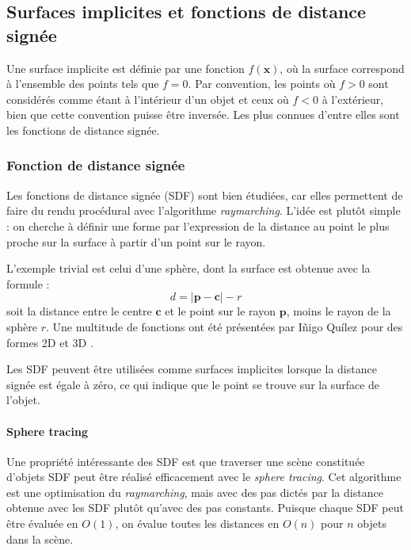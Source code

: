 \subsection{Surfaces implicites et fonctions de distance signée}
\label{sec:sdf}

Une surface implicite est définie par une fonction $f(\mathbf{x})$, où la surface correspond à l'ensemble des points tels que $f = 0$. Par convention, les points où $f > 0$ sont considérés comme étant à l'intérieur d'un objet et ceux où $f < 0$ à l'extérieur, bien que cette convention puisse être inversée. Les plus connues d'entre elles sont les fonctions de distance signée.

\subsubsection{Fonction de distance signée}

Les fonctions de distance signée (SDF) sont bien étudiées, car elles permettent de faire du rendu procédural avec l'algorithme \textit{raymarching}. L'idée est plutôt simple : on cherche à définir une forme par l'expression de la distance au point le plus proche sur la surface à partir d'un point sur le rayon.

L'exemple trivial est celui d'une sphère, dont la surface est obtenue avec la formule :
\begin{equation}
d = |\mathbf{p} - \mathbf{c}| - r
\end{equation}
soit la distance entre le centre $\mathbf{c}$ et le point sur le rayon $\mathbf{p}$, moins le rayon de la sphère $r$. Une multitude de fonctions ont été présentées par Iñigo Quílez pour des formes 2D et 3D \cite{quilez_sdf}.

Les SDF peuvent être utilisées comme surfaces implicites lorsque la distance signée est égale à zéro, ce qui indique que le point se trouve sur la surface de l'objet.

\paragraph{Sphere tracing}

Une propriété intéressante des SDF est que traverser une scène constituée d'objets SDF peut être réalisé efficacement avec le \textit{sphere tracing}. Cet algorithme est une optimisation du \textit{raymarching}, mais avec des pas dictés par la distance obtenue avec les SDF plutôt qu'avec des pas constants. Puisque chaque SDF peut être évaluée en $O(1)$, on évalue toutes les distances en $O(n)$ pour $n$ objets dans la scène.

